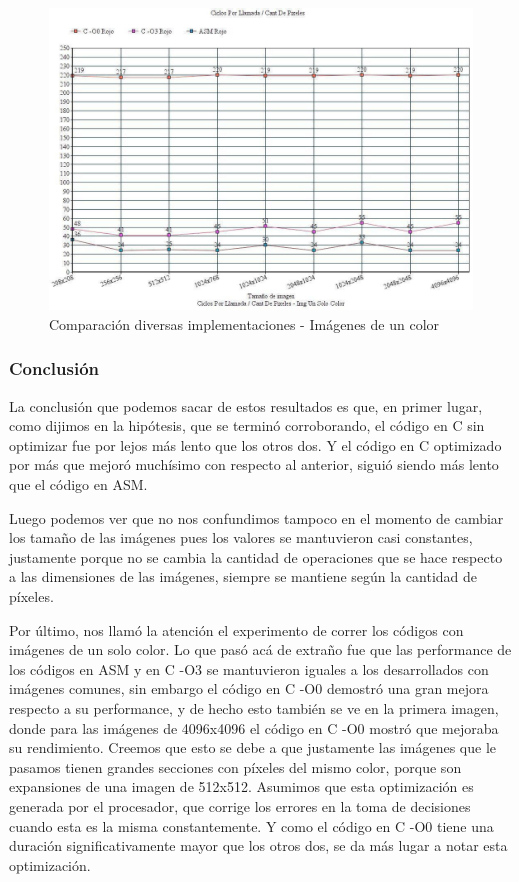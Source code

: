 \begin{figure}[h!]
\centering
\captionsetup{justification=centering}
	\includegraphics[width = 15 cm, height = 8 cm]{imagenes/mismoColor.jpg}
	\caption[center]{Comparación diversas implementaciones - Imágenes de un color}
\end{figure}

\subsubsection{Conclusión}
\par{La conclusión que podemos sacar de estos resultados es que, en primer lugar, como dijimos en la hipótesis, que se terminó corroborando, el código en C sin optimizar fue por lejos más lento que los otros dos. Y el código en C optimizado por más que mejoró muchísimo con respecto al anterior, siguió siendo más lento que el código en ASM.}
\par{Luego podemos ver que no nos confundimos tampoco en el momento de cambiar los tamaño de las imágenes pues los valores se mantuvieron casi constantes, justamente porque no se cambia la cantidad de operaciones que se hace respecto a las dimensiones de las imágenes, siempre se mantiene según la cantidad de píxeles.}
\par{Por último, nos llamó la atención el experimento de correr los códigos con imágenes de un solo color. Lo que pasó acá de extraño fue que las performance de los códigos en ASM y en C -O3 se mantuvieron iguales a los desarrollados con imágenes comunes, sin embargo el código en C -O0 demostró una gran mejora respecto a su performance, y de hecho esto también se ve en la primera imagen, donde para las imágenes de 4096x4096 el código en C -O0 mostró que mejoraba su rendimiento. Creemos que esto se debe a que justamente las imágenes que le pasamos tienen grandes secciones con píxeles del mismo color, porque son expansiones de una imagen de 512x512. Asumimos que esta optimización es generada por el procesador, que corrige los errores en la toma de decisiones cuando esta es la misma constantemente. Y como el código en C -O0 tiene una duración significativamente mayor que los otros dos, se da más lugar a notar esta optimización.}
	

